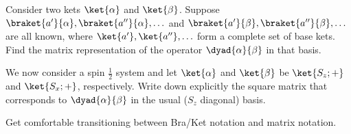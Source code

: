 \begin{question}


  \begin{questionpart}
    Consider two kets $\ket{\alpha}$ and $\ket{\beta}$. Suppose
    $\braket{a'}{\alpha}, \braket{a''}{\alpha},\ldots$ and
    $\braket{a'}{\beta}, \braket{a''}{\beta},\ldots$ are all known,
    where $\ket{a'}, \ket{a''}, \ldots$ form a complete set of base
    kets. Find the matrix representation of the operator
    $\dyad{\alpha}{\beta}$ in that basis.
  \end{questionpart}


  \begin{questionpart}
    We now consider a spin $\frac 1 2$ system and let $\ket{\alpha}$
    and $\ket{\beta}$ be $\ket{S_z; +}$ and $\ket{S_x; +}$,
    respectively. Write down explicitly the square matrix that
    corresponds to $\dyad{\alpha}{\beta}$ in the usual ($S_z$
    diagonal) basis.
  \end{questionpart}

\end{question}

\begin{purpose}
  Get comfortable transitioning between Bra/Ket notation and matrix
  notation.
\end{purpose}

